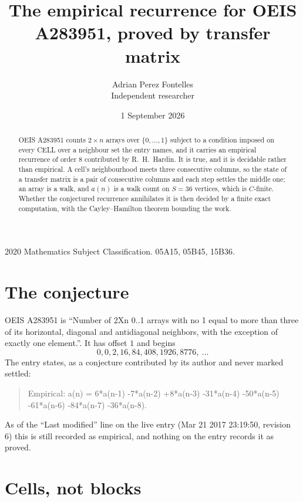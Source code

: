 \documentclass[11pt,a4paper]{article}
\title{The empirical recurrence for OEIS A283951, proved by transfer matrix}
\author{Adrian Perez Fontelles\\ \small Independent researcher}
\date{1 September 2026}
\theoremstyle{plain}
\theoremstyle{definition}
\begin{document}
\maketitle

\begin{abstract}
OEIS A283951 counts $2\times n$ arrays over $\{0,\dots,1\}$ subject to a condition imposed on
every CELL over a neighbour set the entry names, and it carries an empirical recurrence of
order $8$ contributed by R.~H.~Hardin. It is true, and it is decidable rather than
empirical. A cell's neighbourhood meets three consecutive columns, so the state of a transfer
matrix is a pair of consecutive columns and each step settles the middle one; an array is a
walk, and $a(n)$ is a walk count on $S=36$ vertices, which is $C$-finite. Whether the
conjectured recurrence annihilates it is then decided by a finite exact computation, with the
Cayley--Hamilton theorem bounding the work.
\end{abstract}

\noindent\small 2020 Mathematics Subject Classification. 05A15, 05B45, 15B36.\normalsize

\section{The conjecture}

OEIS A283951 is ``Number of 2Xn 0..1 arrays with no 1 equal to more than three of its horizontal, diagonal and antidiagonal neighbors, with the exception of exactly one element.''. It has offset $1$ and begins
\[
0, 0, 2, 16, 84, 408, 1926, 8776,\ \dots
\]
The entry states, as a conjecture contributed by its author and never marked settled:
\begin{quote}
Empirical: a(n) = 6*a(n-1) -7*a(n-2) +8*a(n-3) -31*a(n-4) -50*a(n-5) -61*a(n-6) -84*a(n-7) -36*a(n-8).
\end{quote}
As of the ``Last modified'' line on the live entry (Mar 21 2017 23:19:50, revision 6) this is still
recorded as empirical, and nothing on the entry records it as proved.

\section{Cells, not blocks}
\end{document}
